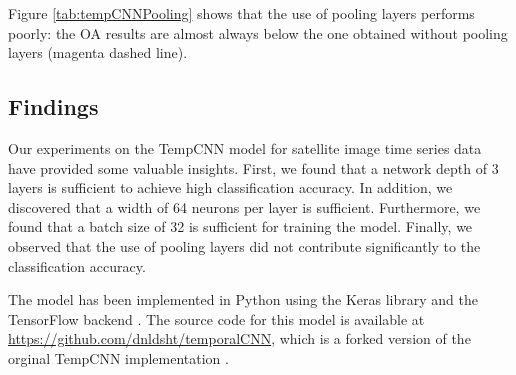 Figure \ref{tab:tempCNNPooling} shows that the use of pooling layers performs poorly: the OA results are almost always
below the one obtained without pooling layers (magenta dashed line). 

\subsection{Findings}

Our experiments on the TempCNN model for satellite image time series data have provided some valuable insights. 
First, we found that a network depth of 3 layers is sufficient to achieve high classification accuracy. 
In addition, we discovered that a width of 64 neurons per layer is sufficient. 
Furthermore, we found that a batch size of 32 is sufficient for training the model. 
Finally, we observed that the use of pooling layers did not contribute significantly to the classification accuracy.

The model has been implemented in Python using the Keras library \cite{chollet2015keras} and the TensorFlow backend \cite{tensorflow2015-whitepaper}.
The source code for this model is available at \url{https://github.com/dnldsht/temporalCNN}, which is a forked version of the orginal TempCNN implementation \cite{tempCNN}.
